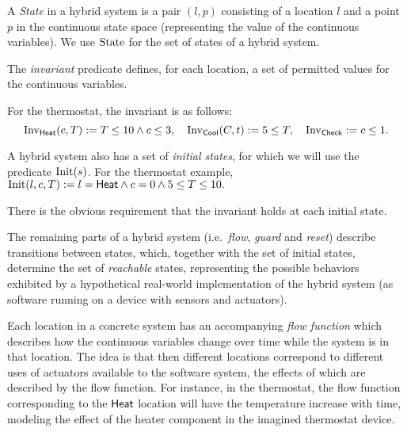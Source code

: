 \documentclass[runningheads]{llncs}
\newcommand{\weg}[1]{}
\newcommand{\Heat}{{\sf Heat}}
\newcommand{\Cool}{{\sf Cool}}
\newcommand{\Chec}{{\sf Check}}
\newcommand{\State}{{\rm State}}
\newcommand{\Inv}{{\rm Inv}}
\newcommand{\Init}{{\rm Init}}
\begin{document}
A \emph{State} in a hybrid system is a pair $(l, p)$ consisting of a
location $l$ and a point $p$ in the continuous state space
(representing the value of the continuous variables). We use $\State$
for the set of states of a hybrid system.

The {\em invariant\/} predicate defines, for each location, a set of
permitted values for the continuous variables. 
\weg{
We will use this in the
definitions of transition relations in a moment. The morphism field
expresses that this invariant respects |Point|'s setoid equality. We
further require that it is \emph{stable}, where |stable P| is defined
as |~ ~P -> P|. We discuss the reason for this stability requirement
in section \ref{dn}.
}
For the thermostat, the invariant is as follows: $$\Inv_{\Heat}(c,T) := T\leq 10\wedge c\leq 3,\quad \Inv_{\Cool}(C,t) := 5 \leq T,\quad \Inv_{\Chec} := c\leq 1.$$

A hybrid system also has a set of \emph{initial states}, for which we
will use the predicate $\Init(s)$.  For the thermostat example,
$\Init(l,c,T) := l= \Heat \wedge c= 0 \wedge 5 \leq T \leq 10.$
\weg{
\begin{code}
  {s: State pipe location s = Heat /\ 5 <= temp s <= 10 /\ clock s == 0}
\end{code}
where |location|, |temp|, and |clock| are the obvious projections.
} 
There is the obvious requirement that the invariant holds at each
initial state.


The remaining parts of a hybrid system (i.e.\ {\em flow}, {\em guard}
and {\em reset}) describe transitions between states, which, together
with the set of initial states, determine the set of \emph{reachable}
states, representing the possible behaviors exhibited by a
hypothetical real-world implementation of the hybrid system (as
software running on a device with sensors and actuators).


Each location in a concrete system has an accompanying \emph{flow
  function} which describes how the continuous variables change over
time while the system is in that location. The idea is that then
different locations correspond to different uses of actuators
available to the software system, the effects of which are described
by the flow function. For instance, in the thermostat, the flow
function corresponding to the $\Heat$ location will have the
temperature increase with time, modeling the effect of the heater
component in the imagined thermostat device.
\end{document}
